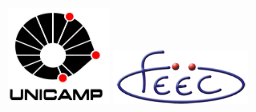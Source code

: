     \begin{figure}
        \begin{minipage}{.5\linewidth}
            \flushleft
            \includegraphics[height=1in]{0_img/logo_unicamp.jpg}
        \end{minipage}%
        \begin{minipage}{.5\linewidth}
            \flushright
            \includegraphics[width=1.4in]{0_img/logo_feec.png}
        \end{minipage}
    \end{figure}